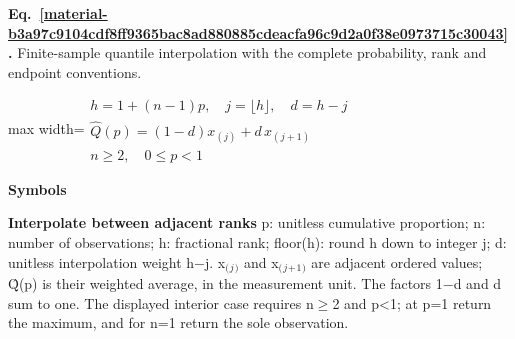 \documentclass[11pt,a4paper]{article}
\begin{document}
\par\medskip
\noindent\begin{minipage}{\linewidth}
\label{material-b3a97c9104cdf8ff9365bac8ad880885cdeacfa96c9d2a0f38e0973715c30043}
\noindent\textbf{Eq.~\ref*{material-b3a97c9104cdf8ff9365bac8ad880885cdeacfa96c9d2a0f38e0973715c30043}.} Finite-sample quantile interpolation with the complete probability, rank and endpoint conventions.\par\nopagebreak
\begin{center}\begin{adjustbox}{max width=\linewidth}$\displaystyle \begin{gathered}h=1+(n-1)p,\quad j=\lfloor h\rfloor,\quad d=h-j\\\widehat Q(p)=(1-d)x_{(j)}+d\,x_{(j+1)}\\ n\ge2,\quad 0\le p<1\end{gathered}$\end{adjustbox}\end{center}

\par\noindent\textbf{Symbols}

\par\noindent\textbf{Interpolate between adjacent ranks} p: unitless cumulative proportion; n: number of observations; h: fractional rank; floor(h): round h down to integer j; d: unitless interpolation weight h\ensuremath{-}j. x\ensuremath{{}_{(}}\ensuremath{{}_j}\ensuremath{{}_{)}} and x\ensuremath{{}_{(}}\ensuremath{{}_j}\ensuremath{{}_+}\ensuremath{{}_1}\ensuremath{{}_{)}} are adjacent ordered values; Q̂(p) is their weighted average, in the measurement unit. The factors 1\ensuremath{-}d and d sum to one. The displayed interior case requires n\ensuremath{\ge}2 and p<1; at p=1 return the maximum, and for n=1 return the sole observation.

\end{minipage}\par
\medskip
\end{document}
